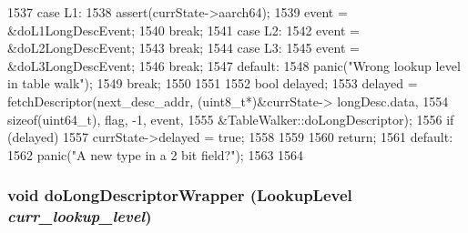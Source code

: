 \begin{DoxyCode}
{{{{1537               case L1:
1538                 assert(currState->aarch64);
1539                 event = &doL1LongDescEvent;
1540                 break;
1541               case L2:
1542                 event = &doL2LongDescEvent;
1543                 break;
1544               case L3:
1545                 event = &doL3LongDescEvent;
1546                 break;
1547               default:
1548                 panic("Wrong lookup level in table walk\n");
1549                 break;
1550             }
1551 
1552             bool delayed;
1553             delayed = fetchDescriptor(next_desc_addr, (uint8_t*)&currState->
      longDesc.data,
1554                                       sizeof(uint64_t), flag, -1, event,
1555                                       &TableWalker::doLongDescriptor);
1556             if (delayed) {
1557                  currState->delayed = true;
1558             }
1559         }
1560         return;
1561       default:
1562         panic("A new type in a 2 bit field?\n");
1563     }
1564 }
\end{DoxyCode}
\hypertarget{classArmISA_1_1TableWalker_a6a293b1492cb952d30d4b0de42aa9e7e}{
\subsubsection[{doLongDescriptorWrapper}]{\setlength{\rightskip}{0pt plus 5cm}void doLongDescriptorWrapper ({\bf LookupLevel} {\em curr\_\-lookup\_\-level})}}
\label{classArmISA_1_1TableWalker_a6a293b1492cb952d30d4b0de42aa9e7e}



